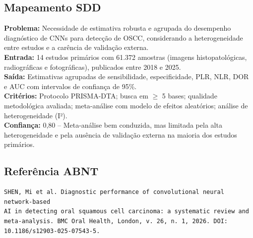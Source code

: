 \subsection{Mapeamento SDD}
\textbf{Problema:} Necessidade de estimativa robusta e agrupada do desempenho
diagnóstico de CNNs para detecção de OSCC, considerando a heterogeneidade entre
estudos e a carência de validação externa. \\
\textbf{Entrada:} 14 estudos primários com 61.372 amostras (imagens histopatológicas,
radiográficas e fotográficas), publicados entre 2018 e 2025. \\
\textbf{Saída:} Estimativas agrupadas de sensibilidade, especificidade, PLR,
NLR, DOR e AUC com intervalos de confiança de 95\%. \\
\textbf{Critérios:} Protocolo PRISMA-DTA; busca em $\geq$ 5 bases; qualidade
metodológica avaliada; meta-análise com modelo de efeitos aleatórios;
análise de heterogeneidade (I²). \\
\textbf{Confiança:} 0,80 -- Meta-análise bem conduzida, mas limitada pela alta
heterogeneidade e pela ausência de validação externa na maioria dos estudos
primários.

\subsection{Referência ABNT}
\begin{verbatim}
SHEN, Mi et al. Diagnostic performance of convolutional neural network-based
AI in detecting oral squamous cell carcinoma: a systematic review and
meta-analysis. BMC Oral Health, London, v. 26, n. 1, 2026. DOI:
10.1186/s12903-025-07543-5.
\end{verbatim}
